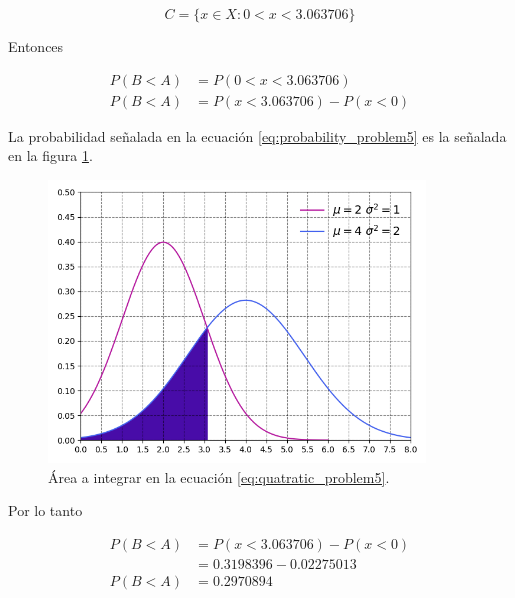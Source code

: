 \begin{equation*}
    C=\{x\in X : 0<x<3.063706\}
\end{equation*}

Entonces

\begin{align}
    P(B<A) & = P(0<x<3.063706)                                        \\
    P(B<A) & = P(x<3.063706) - P(x<0) \label{eq:probability_problem5}
\end{align}

La probabilidad señalada en la ecuación \ref{eq:probability_problem5} es la señalada en la figura \ref{fig:probability_problem5}.

\begin{figure}[H]
    \centering
    \includegraphics[width=10cm]{Graphics/problem5.png}
    \caption{Área a integrar en la ecuación \ref{eq:quatratic_problem5}.}
    \label{fig:probability_problem5}
\end{figure}

Por lo tanto

\begin{align*}
    P(B<A) & = P(x<3.063706) - P(x<0) \\
           & = 0.3198396 - 0.02275013 \\
    P(B<A) & = 0.2970894
\end{align*}